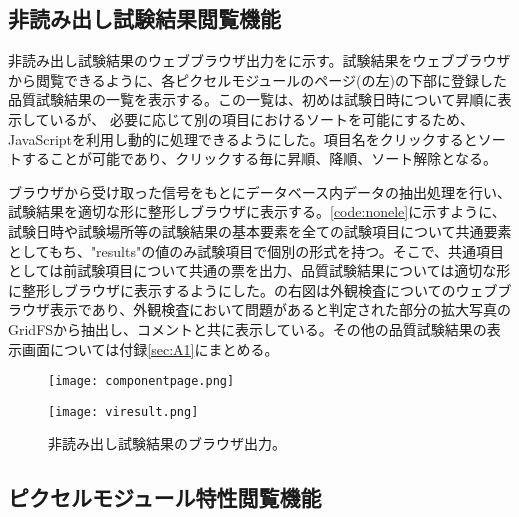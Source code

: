 \subsection{非読み出し試験結果閲覧機能}
\label{sec:non-elec-view}

非読み出し試験結果のウェブブラウザ出力をに示す。試験結果をウェブブラウザから閲覧できるように、各ピクセルモジュールのページ(の左)の下部に登録した品質試験結果の一覧を表示する。この一覧は、初めは試験日時について昇順に表示しているが、
必要に応じて別の項目におけるソートを可能にするため、JavaScriptを利用し動的に処理できるようにした。項目名をクリックするとソートすることが可能であり、クリックする毎に昇順、降順、ソート解除となる。

ブラウザから受け取った信号をもとにデータベース内データの抽出処理を行い、試験結果を適切な形に整形しブラウザに表示する。\cref{code:nonele}に示すように、試験日時や試験場所等の試験結果の基本要素を全ての試験項目について共通要素としてもち、"results"の値のみ試験項目で個別の形式を持つ。そこで、共通項目としては前試験項目について共通の票を出力、品質試験結果については適切な形に整形しブラウザに表示するようにした。の右図は外観検査についてのウェブブラウザ表示であり、外観検査において問題があると判定された部分の拡大写真のGridFSから抽出し、コメントと共に表示している。その他の品質試験結果の表示画面については付録\ref{sec:A1}にまとめる。

\begin{figure}[tbp]
  \begin{minipage}[b]{0.45\linewidth}
    \centering
    \texttt{[image: componentpage.png]}
  \end{minipage}
  \begin{minipage}[b]{0.45\linewidth}
    \centering
    \texttt{[image: viresult.png]}
  \end{minipage}
    \caption{非読み出し試験結果のブラウザ出力。}
    \label{fig:noneleresult}
\end{figure}

\subsection{ピクセルモジュール特性閲覧機能}
\label{sec:prop-view}

